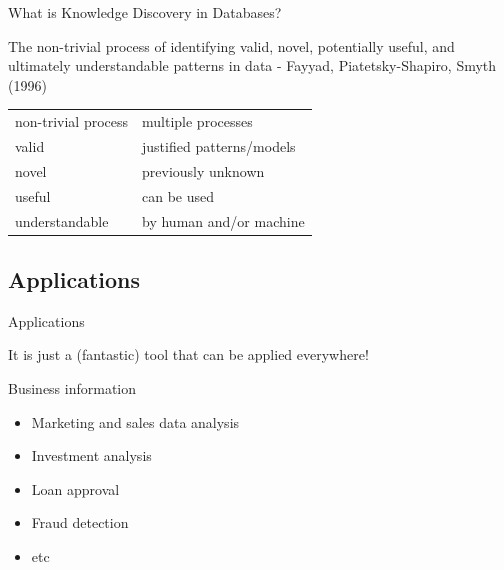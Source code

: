 \documentclass{beamer}
\begin{document}
\begin{frame}{What is Knowledge Discovery in Databases?}


\begin{block}{}
The non-trivial process of identifying valid, novel, potentially useful, and ultimately understandable patterns in data - Fayyad, Piatetsky-Shapiro, Smyth (1996)
\end{block}

\begin{center}
\begin{tabular}{l|l}
non-trivial process &  multiple processes\\
valid & justified patterns/models\\
novel & previously unknown\\
useful &  can be used\\
understandable & by human and/or machine
\end{tabular}
\end{center}


\end{frame}

\subsection{Applications}

\begin{frame}{Applications}

It is just a (fantastic) tool that can be applied everywhere!

Business information

\begin{itemize}
 \item Marketing and sales data analysis
 \item Investment analysis
 \item Loan approval
 \item Fraud detection
 \item etc
\end{itemize}

\end{frame}
\end{document}
